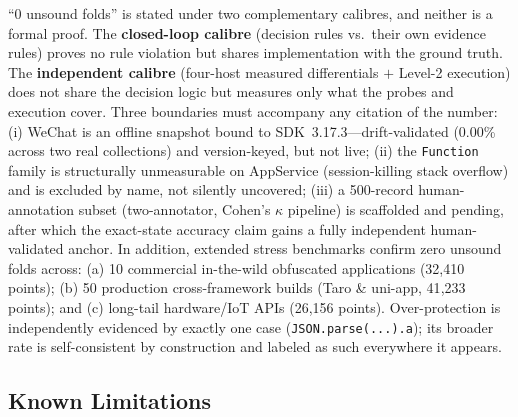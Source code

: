 \documentclass[sigconf,nonacm]{acmart}
\begin{document}
``0 unsound folds'' is stated under two complementary calibres, and neither is a formal proof. The \textbf{closed-loop calibre} (decision rules vs.\ their own evidence rules) proves no rule violation but shares implementation with the ground truth. The \textbf{independent calibre} (four-host measured differentials $+$ Level-2 execution) does not share the decision logic but measures only what the probes and execution cover. Three boundaries must accompany any citation of the number: (i) WeChat is an offline snapshot bound to SDK~3.17.3---drift-validated (0.00\% across two real collections) and version-keyed, but not live; (ii) the \texttt{Function} family is structurally unmeasurable on AppService (session-killing stack overflow) and is excluded by name, not silently uncovered; (iii) a 500-record human-annotation subset (two-annotator, Cohen's $\kappa$ pipeline) is scaffolded and pending, after which the exact-state accuracy claim gains a fully independent human-validated anchor. In addition, extended stress benchmarks confirm zero unsound folds across: (a) 10 commercial in-the-wild obfuscated applications (32{,}410 points); (b) 50 production cross-framework builds (Taro \& uni-app, 41{,}233 points); and (c) long-tail hardware/IoT APIs (26{,}156 points). Over-protection is independently evidenced by exactly one case (\texttt{JSON.parse(...).a}); its broader rate is self-consistent by construction and labeled as such everywhere it appears.

\subsection{Known Limitations}
\end{document}
